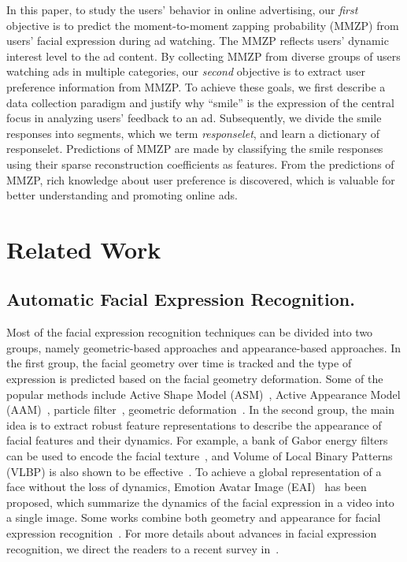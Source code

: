 \documentclass[twoside,leqno,twocolumn]{article}
\begin{document}
In this paper, to study the users' behavior in online advertising, our \textit{first} objective is to predict the moment-to-moment zapping probability (MMZP) from users' facial expression during ad watching. The MMZP reflects users' dynamic interest level to the ad content. By collecting MMZP from diverse groups of users watching ads in multiple categories, our \textit{second} objective is to extract user preference information from MMZP. To achieve these goals, we first describe a data collection paradigm and justify why ``smile'' is the expression of the central focus in analyzing users' feedback to an ad. Subsequently, we divide the smile responses into segments, which we term \textit{responselet}, and learn a dictionary of responselet. Predictions of MMZP are made by classifying the smile responses using their sparse reconstruction coefficients as features. From the predictions of MMZP, rich knowledge about user preference is discovered, which is valuable for better understanding and promoting online ads. 


\section{Related Work}

\subsection{Automatic Facial Expression Recognition.}

Most of the facial expression recognition techniques can be divided into two groups, namely geometric-based approaches and appearance-based approaches. In the first group, the facial geometry over time is tracked and the type of expression is predicted based on the facial geometry deformation. Some of the popular methods include Active Shape Model (ASM)~\cite{Hu04}, Active Appearance Model (AAM)~\cite{Lucey06}, particle filter~\cite{Valstar05}, geometric deformation~\cite{Kotsia07}. In the second group, the main idea is to extract robust feature representations to describe the appearance of facial features and their dynamics. For example, a bank of Gabor energy filters can be used to encode the facial texture~\cite{Whitehill09}, and Volume of Local Binary Patterns (VLBP) is also shown to be effective~\cite{Zhao07}. To achieve a global representation of a face without the loss of dynamics, Emotion Avatar Image (EAI)~\cite{Yang12} has been proposed, which summarize the dynamics of the facial expression in a video into a single image. Some works combine both geometry and appearance for facial expression recognition~\cite{Chen2012}. For more details about advances in facial expression recognition, we direct the readers to a recent survey in~\cite{Survey2015}.
\end{document}
